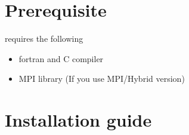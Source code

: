 \documentclass[letterpaper,10pt,pdftex,openany,english]{sphinxmanual}
\begin{document}
\section{Prerequisite}
\label{\detokenize{install:prerequisite}}
\sphinxAtStartPar
{} requires the following
\begin{itemize}
\item {} 
\sphinxAtStartPar
fortran and C compiler

\item {} 
\sphinxAtStartPar
MPI library (If you use MPI/Hybrid version)

\end{itemize}


\section{Installation guide}
\end{document}

